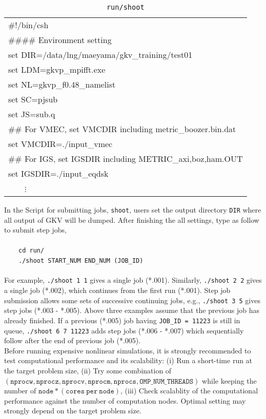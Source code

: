 \begin{table}[tb!]
  \caption{\texttt{run/shoot}}
  \label{table:run/shoot}
  \centering
  \begin{tabular}{| l |}
  \hline
  \#!/bin/csh\\
  \#\#\#\# Environment setting\\
  set DIR=/data/lng/maeyama/gkv\_training/test01\\
  set LDM=gkvp\_mpifft.exe\\
  set NL=gkvp\_f0.48\_namelist\\
  set SC=pjsub\\
  set JS=sub.q\\
  \#\# For VMEC, set VMCDIR including metric\_boozer.bin.dat\\
  set VMCDIR=./input\_vmec\\
  \#\# For IGS, set IGSDIR including METRIC\_{axi,boz,ham}.OUT\\
  set IGSDIR=./input\_eqdsk\\
  ~~~~$\vdots$\\
  \hline
  \end{tabular}
\end{table}
In the Script for submitting jobs, \texttt{shoot}, users set the output directory \texttt{DIR} where all output of GKV will be dumped. After finishing the all settings, type as follow to submit step jobs,\\
~\\
~~~~\texttt{cd run/}\\
~~~~\texttt{./shoot  START\_NUM  END\_NUM  (JOB\_ID)}\\
~\\
For example, \texttt{./shoot  1  1} gives a single job (*.001). Similarly, \texttt{./shoot  2  2} gives a single job (*.002), which continues from the first run (*.001). Step job submission allows some sets of successive continuing jobs, e.g., \texttt{./shoot  3  5} gives step jobs (*.003 - *.005). Above three examples assume that the previous job has already finished. If a previous (*.005) job having \texttt{JOB\_ID = 11223} is still in queue, \texttt{./shoot  6  7 11223} adds step jobs (*.006 - *.007) which sequentially follow after the end of previous job (*.005).\\

Before running expensive nonlinear simulations, it is strongly recommended to test computational performance and its scalability: (i) Run a short-time run at the target problem size, (ii) Try some combination of $(\mathtt{nprocw},\mathtt{nprocz},\mathtt{nprocv},\mathtt{nprocm},\mathtt{nprocs},\mathtt{OMP\_NUM\_THREADS})$ while keeping the number of $\mathtt{node}*(\mathtt{cores~per~node})$, (iii) Check scalablity of the computational performance against the number of computation nodes. Optimal setting may strongly depend on the target problem size.  


